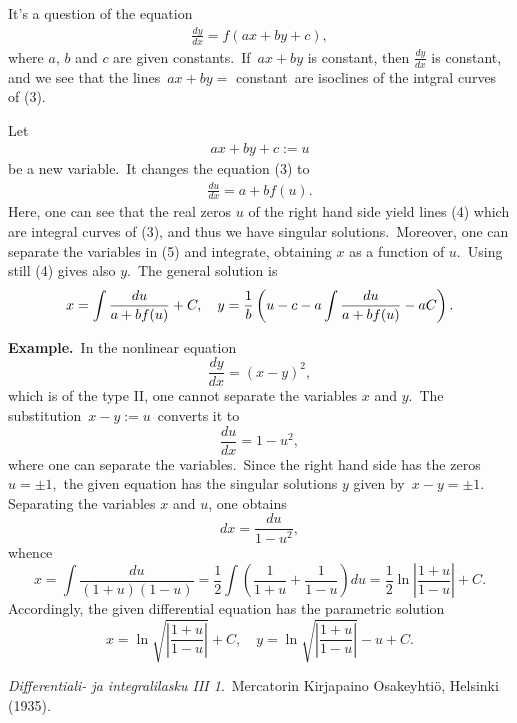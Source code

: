 \documentclass[12pt]{article}
\theoremstyle{definition}
\begin{document}
It's a question of the equation
\begin{align}
\frac{dy}{dx} = f(ax+by+c),
\end{align}
where $a$, $b$ and $c$ are given constants.\, If\, $ax+by$ is constant, then $\frac{dy}{dx}$ is constant, and we see that the lines\, $ax+by =$ constant\, are isoclines of the intgral curves of (3).

Let
\begin{align}
ax+by+c := u
\end{align}
be a new variable.\, It changes the equation (3) to
\begin{align}
\frac{du}{dx} = a+bf(u).
\end{align}
Here, one can see that the real zeros $u$ of the right hand side yield lines (4) which are integral curves of (3), and thus we have singular solutions.\, Moreover, one can separate the variables in (5) and integrate, obtaining $x$ as a function of $u$.\, Using still (4) gives also $y$.\, The general solution is
$$x = \int\frac{du}{a+bf(u)}+C, \quad y = \frac{1}{b}\left(u-c-a\int\frac{du}{a+bf(u)}-aC\right).\\$$


\textbf{Example.}\, In the nonlinear equation
$$\frac{dy}{dx} = (x-y)^2,$$
which is of the type II, one cannot separate the variables $x$ and $y$.\, The substitution\, $x-y := u$\, converts it to
$$\frac{du}{dx} = 1-u^2,$$
where one can separate the variables.\, Since the right hand side has the zeros\, $u = \pm1$,\, the given equation has the singular solutions $y$ given by\, $x-y = \pm1$.\, Separating the variables $x$ and $u$, one obtains
$$dx = \frac{du}{1-u^2},$$
whence
$$x = \int\frac{du}{(1+u)(1-u)} = \frac{1}{2}\int\left(\frac{1}{1+u}+\frac{1}{1-u}\right)du 
= \frac{1}{2}\ln\left|\frac{1+u}{1-u}\right|+C.$$
Accordingly, the given differential equation has the parametric solution
$$x = \ln\sqrt{\left|\frac{1\!+\!u}{1\!-\!u}\right|}+C, \quad y = \ln\sqrt{\left|\frac{1\!+\!u}{1\!-\!u}\right|}-u\!+\!C.$$

\begin{thebibliography}{9}
 {\em Differentiali- ja integralilasku III 1}.\, Mercatorin Kirjapaino Osakeyhti\"o, Helsinki (1935).
\end{thebibliography}

\end{document}
